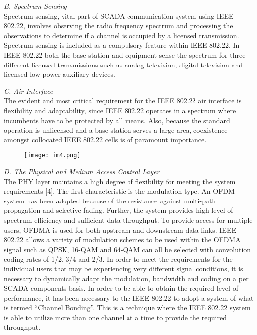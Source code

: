 \documentclass[conference]{IEEEtran}
\begin{document}
\begin{Summary - }
\vspace{1cm}


\vspace{0.2cm}\emph{B. \hspace{0.3cm}Spectrum Sensing}\\
Spectrum sensing, vital part of SCADA communication
system using IEEE 802.22, involves observing the radio
frequency spectrum and processing the observations to
determine if a channel is occupied by a licensed transmission.
Spectrum sensing is included as a compulsory feature within
IEEE 802.22. In IEEE 802.22 both the base station and
equipment sense the spectrum for three different licensed
transmissions such as analog television, digital television and
licensed low power auxiliary devices.

\vspace{0.2cm}\emph{C. \hspace{0.3cm}Air Interface}\\
The evident and most critical requirement for the IEEE
802.22 air interface is flexibility and adaptability, since IEEE
802.22 operates in a spectrum where incumbents have to be
protected by all means. Also, because the standard operation is
unlicensed and a base station serves a large area, coexistence
amongst collocated IEEE 802.22 cells is of paramount
importance.

\vspace{1cm}


\begin{figure}[h!] %
  \centering
  \texttt{[image: im4.png]}\\
\end{figure}

\vspace{1cm}


\emph{D. \hspace{0.3cm}The Physical and Medium Access Control Layer}\\
The PHY layer maintains a high degree of flexibility for
meeting the system requirements [4]. The first characteristic is
the modulation type. An OFDM system has been adopted
because of the resistance against multi-path propagation and
selective fading. Further, the system provides high level of
spectrum efficiency and sufficient data throughput. To provide
access for multiple users, OFDMA is used for both upstream
and downstream data links. IEEE 802.22 allows a variety of
modulation schemes to be used within the OFDMA signal such
as QPSK, 16-QAM and 64-QAM can all be selected with
convolution coding rates of 1/2, 3/4 and 2/3. In order to meet
the requirements for the individual users that may be
experiencing very different signal conditions, it is necessary to
dynamically adapt the modulation, bandwidth and coding on a
per SCADA components basis. In order to be able to obtain the
required level of performance, it has been necessary to the
IEEE 802.22 to adopt a system of what is termed “Channel
Bonding”. This is a technique where the IEEE 802.22 system is
able to utilize more than one channel at a time to provide the
required throughput.


\end{Summary - }
\end{document}
